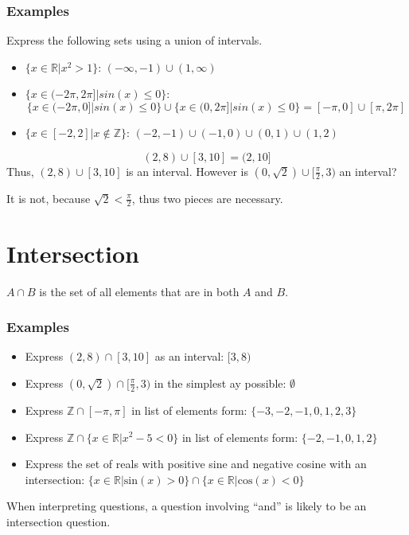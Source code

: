 \documentclass[12pt]{report}
\newcommand{\Z}{\mathbb{Z}}
\newcommand{\R}{\mathbb{R}}
\begin{document}
\begin{flushleft}
\subsubsection*{Examples}
Express the following sets using a union of intervals.
\begin{itemize}
\item \(\{x \in \R | x^2 > 1\}\): \((-\infty, -1) \cup (1, \infty)\)
\item \(\{x \in (-2\pi, 2\pi] | sin(x) \leq 0\}\): 
\[\{x \in (-2\pi, 0] | sin(x) \leq 0\} \cup \{x \in (0, 2\pi] | sin(x) \leq 0\} = [-\pi, 0] \cup [\pi, 2\pi]\]
\item \(\{x \in [-2, 2] | x \notin \Z\}\): \((-2, -1) \cup (-1, 0) \cup (0, 1) \cup (1, 2)\)
\end{itemize}

\[(2, 8) \cup [3, 10] = (2, 10]\]
Thus, \((2, 8) \cup [3, 10]\) is an interval. However is \((0, \sqrt{2}) \cup [\frac{\pi}{2}, 3)\) an interval?
\par
It is not, because \(\sqrt{2} < \frac{\pi}{2}\), thus two pieces are necessary.

\section*{Intersection}
\(A \cap B\) is the set of all elements that are in both \(A\) and \(B\).

\subsubsection*{Examples}
\begin{itemize}
    \item Express \((2, 8) \cap [3, 10]\) as an interval: \([3, 8)\)
    \item Express \((0, \sqrt{2}) \cap [\frac{\pi}{2}, 3)\) in the simplest ay possible: \(\emptyset\)
    \item Express \(\Z \cap [-\pi, \pi]\) in list of elements form: \(\{-3, -2, -1, 0, 1, 2, 3\}\)
    \item Express \(\Z \cap \{x \in \R | x^2 - 5 < 0\}\) in list of elements form: \(\{-2, -1, 0, 1, 2\}\)
    \item Express the set of reals with positive sine and negative cosine with an intersection: \(\{x \in \R | \mathrm{sin}(x) > 0\} \cap \{x \in \R | \mathrm{cos}(x) < 0\}\)
\end{itemize}

When interpreting questions, a question involving ``and'' is likely to be an intersection question.


\end{flushleft}
\end{document}
